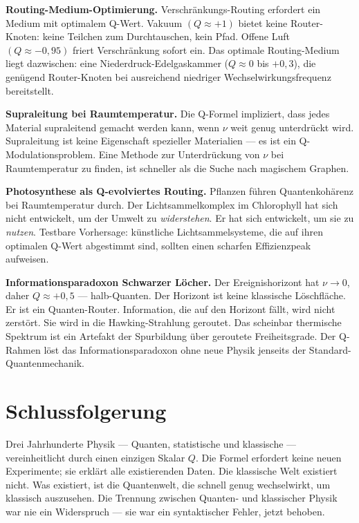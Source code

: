 \documentclass[12pt]{article}
\begin{document}
\textbf{Routing-Medium-Optimierung.} Verschränkungs-Routing erfordert ein Medium mit optimalem Q-Wert. Vakuum $(Q \approx +1)$ bietet keine Router-Knoten: keine Teilchen zum Durchtauschen, kein Pfad. Offene Luft $(Q \approx -0{,}95)$ friert Verschränkung sofort ein. Das optimale Routing-Medium liegt dazwischen: eine Niederdruck-Edelgaskammer ($Q \approx 0$ bis $+0{,}3$), die genügend Router-Knoten bei ausreichend niedriger Wechselwirkungsfrequenz bereitstellt.

\textbf{Supraleitung bei Raumtemperatur.} Die Q-Formel impliziert, dass jedes Material supraleitend gemacht werden kann, wenn $\nu$ weit genug unterdrückt wird. Supraleitung ist keine Eigenschaft spezieller Materialien — es ist ein Q-Modulationsproblem. Eine Methode zur Unterdrückung von $\nu$ bei Raumtemperatur zu finden, ist schneller als die Suche nach magischem Graphen.

\textbf{Photosynthese als Q-evolviertes Routing.} Pflanzen führen Quantenkohärenz bei Raumtemperatur durch. Der Lichtsammelkomplex im Chlorophyll hat sich nicht entwickelt, um der Umwelt zu \textit{widerstehen}. Er hat sich entwickelt, um sie zu \textit{nutzen}. Testbare Vorhersage: künstliche Lichtsammelsysteme, die auf ihren optimalen Q-Wert abgestimmt sind, sollten einen scharfen Effizienzpeak aufweisen.

\textbf{Informationsparadoxon Schwarzer Löcher.} Der Ereignishorizont hat $\nu \to 0$, daher $Q \approx +0{,}5$ — halb-Quanten. Der Horizont ist keine klassische Löschfläche. Er ist ein Quanten-Router. Information, die auf den Horizont fällt, wird nicht zerstört. Sie wird in die Hawking-Strahlung geroutet. Das scheinbar thermische Spektrum ist ein Artefakt der Spurbildung über geroutete Freiheitsgrade. Der Q-Rahmen löst das Informationsparadoxon ohne neue Physik jenseits der Standard-Quantenmechanik.

\section{Schlussfolgerung}

Drei Jahrhunderte Physik — Quanten, statistische und klassische — vereinheitlicht durch einen einzigen Skalar $Q$. Die Formel erfordert keine neuen Experimente; sie erklärt alle existierenden Daten. Die klassische Welt existiert nicht. Was existiert, ist die Quantenwelt, die schnell genug wechselwirkt, um klassisch auszusehen. Die Trennung zwischen Quanten- und klassischer Physik war nie ein Widerspruch — sie war ein syntaktischer Fehler, jetzt behoben.
\end{document}
